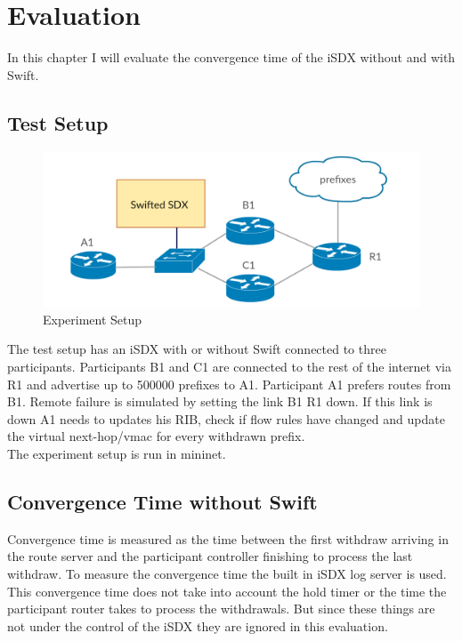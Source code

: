 \chapter{\label{chapter4}Evaluation}

In this chapter I will evaluate the convergence time of the iSDX without and with Swift.

\section{\label{chapter4:Test Setup}Test Setup}

\begin{figure}[h]
\center
\includegraphics[scale = 0.36]{Figures/eval_exp_setup.pdf}
\caption{Experiment Setup}
\end{figure}


The test setup has an iSDX with or without Swift connected to three participants. Participants B1 and C1 are connected to the rest of the internet via R1 and advertise up to 500000 prefixes to A1. Participant A1 prefers routes from B1. Remote failure is simulated by setting the link B1 R1 down. If this link is down A1 needs to updates his RIB, check if flow rules have changed and update the virtual next-hop/vmac for every withdrawn prefix.\\ 
The experiment setup is run in mininet. 



\section{\label{chapter4:Convergence time without Swift}Convergence Time without Swift}

Convergence time is measured as the time between the first withdraw arriving in the route server and the participant controller finishing to process the last withdraw. To measure the convergence time the built in iSDX log server is used.\\
This convergence time does not take into account the hold timer or the time the participant router takes to process the withdrawals. But since these things are not under the control of the iSDX they are ignored in this evaluation.

